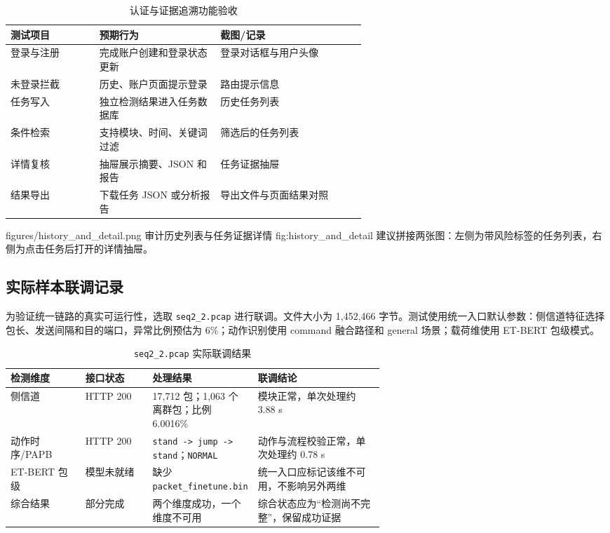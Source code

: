 \begin{table}[H]
\centering
\caption{认证与证据追溯功能验收}
\label{tab:auth_history}
\small
\begin{tabularx}{\linewidth}{p{0.25\linewidth}p{0.34\linewidth}X}
\toprule
\textbf{测试项目} & \textbf{预期行为} & \textbf{截图/记录} \\
\midrule
登录与注册 & 完成账户创建和登录状态更新 & 登录对话框与用户头像 \\
未登录拦截 & 历史、账户页面提示登录 & 路由提示信息 \\
任务写入 & 独立检测结果进入任务数据库 & 历史任务列表 \\
条件检索 & 支持模块、时间、关键词过滤 & 筛选后的任务列表 \\
详情复核 & 抽屉展示摘要、JSON 和报告 & 任务证据抽屉 \\
结果导出 & 下载任务 JSON 或分析报告 & 导出文件与页面结果对照 \\
\bottomrule
\end{tabularx}
\end{table}

\RobotSecFigure
  {figures/history_and_detail.png}
  {审计历史列表与任务证据详情}
  {fig:history_and_detail}
  {建议拼接两张图：左侧为带风险标签的任务列表，右侧为点击任务后打开的详情抽屉。}

\subsection{实际样本联调记录}
\label{subsec:actual_sample}

为验证统一链路的真实可运行性，选取 \texttt{seq2\_2.pcap} 进行联调。文件大小为 1,452,466 字节。测试使用统一入口默认参数：侧信道特征选择包长、发送间隔和目的端口，异常比例预估为 6\%；动作识别使用 command 融合路径和 general 场景；载荷维使用 ET-BERT 包级模式。

\begin{table}[H]
\centering
\caption{\texttt{seq2\_2.pcap} 实际联调结果}
\label{tab:seq2_actual_result}
\small
\begin{tabularx}{\linewidth}{p{0.20\linewidth}p{0.18\linewidth}p{0.24\linewidth}X}
\toprule
\textbf{检测维度} & \textbf{接口状态} & \textbf{处理结果} & \textbf{联调结论} \\
\midrule
侧信道 & HTTP 200 & 17,712 包；1,063 个离群包；比例 6.0016\% & 模块正常，单次处理约 3.88 s \\
动作时序/PAPB & HTTP 200 & \texttt{stand -> jump -> stand}；\texttt{NORMAL} & 动作与流程校验正常，单次处理约 0.78 s \\
ET-BERT 包级 & 模型未就绪 & 缺少 \texttt{packet\_finetune.bin} & 统一入口应标记该维不可用，不影响另外两维 \\
综合结果 & 部分完成 & 两个维度成功，一个维度不可用 & 综合状态应为“检测尚不完整”，保留成功证据 \\
\bottomrule
\end{tabularx}
\end{table}

